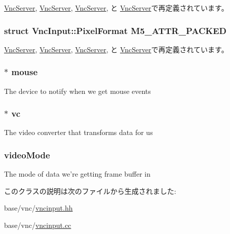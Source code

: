 \hyperlink{group__VncConstants_ga2f0a8a1f1c40593e1e01ce4b8087d792}{VncServer}, \hyperlink{group__VncConstants_ga357314e013d6289c7d085fadd56a290c}{VncServer}, \hyperlink{group__VncConstants_gab34a91a8552f4b2f7e2806b835f39780}{VncServer}, と \hyperlink{group__VncConstants_gac782a3823c0bb07395a234047394d59e}{VncServer}で再定義されています。\hypertarget{classVncInput_a6461d9ad3aa5b6efe59b090c8e8f38af}{
\subsubsection[{M5\_\-ATTR\_\-PACKED}]{\setlength{\rightskip}{0pt plus 5cm}struct {\bf VncInput::PixelFormat}  {\bf M5\_\-ATTR\_\-PACKED}}}
\label{classVncInput_a6461d9ad3aa5b6efe59b090c8e8f38af}


\hyperlink{group__VncConstants_ga2f0a8a1f1c40593e1e01ce4b8087d792}{VncServer}, \hyperlink{group__VncConstants_ga357314e013d6289c7d085fadd56a290c}{VncServer}, \hyperlink{group__VncConstants_gab34a91a8552f4b2f7e2806b835f39780}{VncServer}, と \hyperlink{group__VncConstants_gac782a3823c0bb07395a234047394d59e}{VncServer}で再定義されています。\hypertarget{classVncInput_a8cea9cca80c9b50e4cfedb8d1bd90da0}{
\subsubsection[{mouse}]{$\ast$ {\bf mouse}}}
\label{classVncInput_a8cea9cca80c9b50e4cfedb8d1bd90da0}
The device to notify when we get mouse events \hypertarget{classVncInput_ad44402c880e7d76c01c4085aeecc8bc0}{
\subsubsection[{vc}]{$\ast$ {\bf vc}}}
\label{classVncInput_ad44402c880e7d76c01c4085aeecc8bc0}
The video converter that transforms data for us \hypertarget{classVncInput_a697b3d40f1cd2cf07b3679c99f92efa6}{
\subsubsection[{videoMode}]{ {\bf videoMode}}}
\label{classVncInput_a697b3d40f1cd2cf07b3679c99f92efa6}
The mode of data we're getting frame buffer in 

このクラスの説明は次のファイルから生成されました:\begin{DoxyCompactItemize}
\item 
base/vnc/\hyperlink{vncinput_8hh}{vncinput.hh}\item 
base/vnc/\hyperlink{vncinput_8cc}{vncinput.cc}\end{DoxyCompactItemize}
